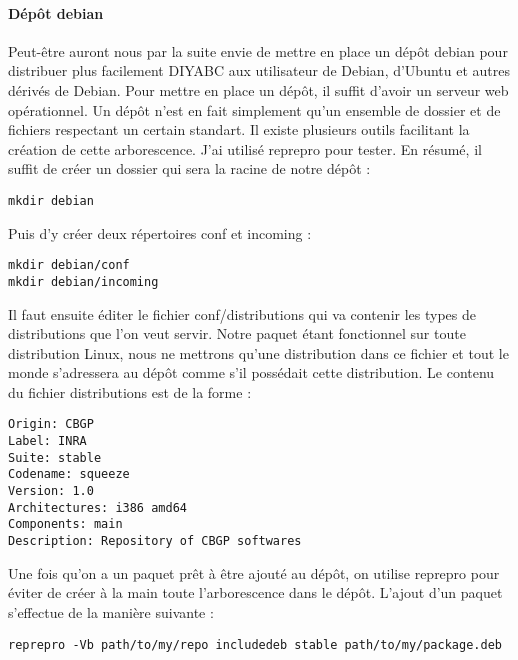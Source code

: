 \documentclass[12pt,a4paper]{article}
\begin{document}
        \paragraph{Dépôt debian}
        Peut-être auront nous par la suite envie de mettre en place un dépôt
        debian pour distribuer plus facilement DIYABC aux utilisateur de Debian,
        d'Ubuntu et autres dérivés de Debian. Pour mettre en place un dépôt, il
        suffit d'avoir un serveur web opérationnel. Un dépôt n'est en fait
        simplement qu'un ensemble de dossier et de fichiers respectant un
        certain standart. Il existe plusieurs outils facilitant la création de
        cette arborescence. J'ai utilisé reprepro pour tester. En résumé, il
        suffit de créer un dossier qui sera la racine de notre dépôt :\\

        \begin{verbatim}mkdir debian \end{verbatim}

        Puis d'y créer deux répertoires conf et incoming :\\

        \begin{verbatim}mkdir debian/conf
mkdir debian/incoming \end{verbatim}

        Il faut ensuite éditer le fichier conf/distributions qui va contenir les
        types de distributions que l'on veut servir. Notre paquet étant
        fonctionnel sur toute distribution Linux, nous ne mettrons qu'une
        distribution dans ce fichier et tout le monde s'adressera au dépôt comme
        s'il possédait cette distribution. Le contenu du fichier distributions
        est de la forme : \\

        \begin{verbatim}Origin: CBGP
Label: INRA
Suite: stable
Codename: squeeze
Version: 1.0
Architectures: i386 amd64
Components: main
Description: Repository of CBGP softwares \end{verbatim}

        Une fois qu'on a un paquet prêt à être ajouté au dépôt, on utilise
        reprepro pour éviter de créer à la main toute l'arborescence dans le
        dépôt. L'ajout d'un paquet s'effectue de la manière suivante :\\

        \begin{verbatim}reprepro -Vb path/to/my/repo includedeb stable path/to/my/package.deb \end{verbatim}
\end{document}
